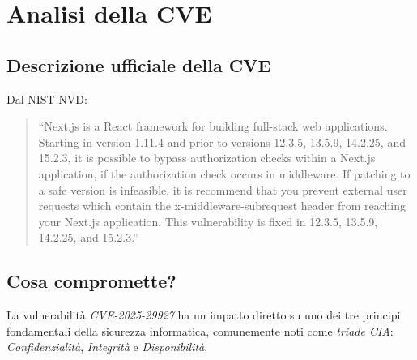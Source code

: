 \documentclass[a4paper,oneside,12pt]{report}
\begin{document}
\chapter{Analisi della CVE}
\label{chap:analisi-cve}

\section{Descrizione ufficiale della CVE}
\label{sec:descrizione-ufficiale-cve}

Dal \href{https://cve.mitre.org/cgi-bin/cvename.cgi?name=CVE-2025-29927}{NIST NVD}:
\begin{quote}
``Next.js is a React framework for building full-stack web applications. Starting in version 1.11.4 and prior to versions 12.3.5, 13.5.9, 14.2.25, and 15.2.3, it is possible to bypass authorization checks within a Next.js application, if the authorization check occurs in middleware. If patching to a safe version is infeasible, it is recommend that you prevent external user requests which contain the x-middleware-subrequest header from reaching your Next.js application. This vulnerability is fixed in 12.3.5, 13.5.9, 14.2.25, and 15.2.3.''
\end{quote}

\section{Cosa compromette?}
\label{sec:cosa-compromette}

La vulnerabilità \emph{CVE-2025-29927} ha un impatto diretto su uno dei tre principi fondamentali della sicurezza informatica, comunemente noti come \emph{triade CIA}: \emph{Confidenzialità}, \emph{Integrità} e \emph{Disponibilità}.
\end{document}
